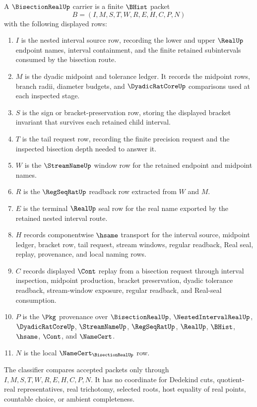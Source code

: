 \begin{definition}
\label{def:bisection-real-carrier}
A $\BisectionRealUp$ carrier is a finite $\BHist$ packet
$$
B=(I,M,S,T,W,R,E,H,C,P,N)
$$
with the following displayed rows:
\begin{enumerate}
\item $I$ is the nested interval source row, recording the lower and upper $\RealUp$ endpoint names, interval containment, and the finite retained subintervals consumed by the bisection route.
\item $M$ is the dyadic midpoint and tolerance ledger. It records the midpoint rows, branch radii, diameter budgets, and $\DyadicRatCoreUp$ comparisons used at each inspected stage.
\item $S$ is the sign or bracket-preservation row, storing the displayed bracket invariant that survives each retained child interval.
\item $T$ is the tail request row, recording the finite precision request and the inspected bisection depth needed to answer it.
\item $W$ is the $\StreamNameUp$ window row for the retained endpoint and midpoint names.
\item $R$ is the $\RegSeqRatUp$ readback row extracted from $W$ and $M$.
\item $E$ is the terminal $\RealUp$ seal row for the real name exported by the retained nested interval route.
\item $H$ records componentwise $\hsame$ transport for the interval source, midpoint ledger, bracket row, tail request, stream windows, regular readback, Real seal, replay, provenance, and local naming rows.
\item $C$ records displayed $\Cont$ replay from a bisection request through interval inspection, midpoint production, bracket preservation, dyadic tolerance readback, stream-window exposure, regular readback, and Real-seal consumption.
\item $P$ is the $\Pkg$ provenance over $\BisectionRealUp$, $\NestedIntervalRealUp$, $\DyadicRatCoreUp$, $\StreamNameUp$, $\RegSeqRatUp$, $\RealUp$, $\BHist$, $\hsame$, $\Cont$, and $\NameCert$.
\item $N$ is the local $\NameCert_{\BisectionRealUp}$ row.
\end{enumerate}
The classifier compares accepted packets only through $I,M,S,T,W,R,E,H,C,P,N$. It has no coordinate for Dedekind cuts, quotient-real representatives, real trichotomy, selected roots, host equality of real points, countable choice, or ambient completeness.
\end{definition}

